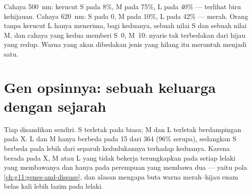 \begin{example}\label{ex:g11:the-eye:curves}
Cahaya \qty{500}{nm}: kerucut S pada 8\%, M pada 75\%, L pada 40\% ---
terlihat biru kehijauan. Cahaya \qty{620}{nm}: S pada 0, M pada 10\%, L
pada 42\% --- merah. Orang tanpa kerucut L hanya menerima, bagi
keduanya, sebuah nilai S dan sebuah nilai M, dan cahaya yang kedua
memberi S~0, M~10: nyaris tak terbedakan dari hijau yang redup. Warna
yang akan dibedakan jenis yang hilang itu meruntuh menjadi satu.
\end{example}

\section{Gen opsinnya: sebuah keluarga dengan sejarah}

\begin{proposition}\label{prop:g11:the-eye:genes}
Tiap  disandikan  sendiri.   S terletak pada
 biasa;   M dan L terletak berdampingan pada 
X.  L dan M hanya berbeda pada 15 dari 364  (96\%
serupa), sedangkan  S berbeda pada lebih dari separuh
kedudukannya terhadap keduanya. Karena berada pada X,  M atau L
yang tidak bekerja terungkapkan pada setiap lelaki yang membawanya dan
hanya pada perempuan yang membawa dua --- yaitu pola
\cref{ch:g11:genes-and-disease}, dan alasan mengapa buta warna
merah--hijau enam belas kali lebih lazim pada lelaki.
\end{proposition}
\admitted

